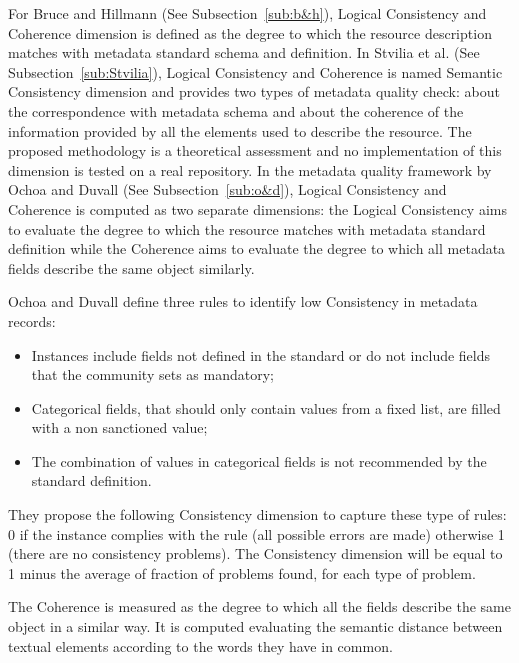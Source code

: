 \documentclass[epsfig,a4paper,12pt,titlepage]{book}
\begin{document}
For Bruce and Hillmann (See Subsection~\ref{sub:b&h}), Logical Consistency and Coherence dimension is defined as the degree to which the resource description matches with metadata standard schema and definition. In Stvilia et al. (See Subsection~\ref{sub:Stvilia}), Logical Consistency and Coherence is named Semantic Consistency dimension and provides two types of metadata quality check: about the correspondence with metadata schema  and about the coherence of the information provided by all the elements used to describe the resource. The proposed methodology is a theoretical assessment and no implementation of this dimension is tested on a real repository.
In the metadata quality framework by Ochoa and Duvall (See Subsection~\ref{sub:o&d}), Logical Consistency and Coherence is computed as two separate dimensions: the Logical Consistency aims to evaluate the degree to which the resource matches with metadata standard definition while the Coherence aims to evaluate the degree to which all metadata fields describe the same object similarly. 

Ochoa and Duvall define three rules to identify low Consistency in metadata records:
\begin{itemize}
    \item Instances include fields not defined in the standard or do not include fields that the community sets as mandatory;
    \item Categorical fields, that should only contain values from a fixed list, are filled with a non sanctioned value;
    \item The combination of values in categorical fields is not recommended by the standard definition.
\end{itemize}
They propose the following Consistency dimension to capture these type of rules: 0 if the instance complies with the rule (all possible errors are made) otherwise 1 (there are no consistency problems). The Consistency dimension will be equal to 1 minus the average
of fraction of problems found, for each type of problem.

The Coherence is measured as the degree to which all the fields describe the same object in a similar way. It is computed evaluating the semantic distance between textual elements according to the words they have in common. 
\end{document}

